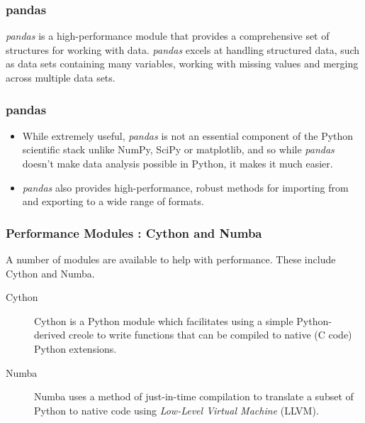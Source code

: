 \documentclass[MASTER.tex]{subfiles}
\begin{document}
\begin{frame}
	\frametitle{pandas}
	\textit{pandas} is a high-performance module that provides a comprehensive set of structures for working with
	data. \textit{pandas} excels at handling structured data, such as data sets containing many variables, working with
	missing values and merging across multiple data sets. 
\end{frame}
\begin{frame}
	\large
	\frametitle{pandas}	
	\begin{itemize}
	
	\item While extremely useful, \textit{pandas} is not an essential component of the Python scientific stack unlike NumPy, SciPy or matplotlib, and so while \textit{pandas} doesn’t
	make data analysis possible in Python, it makes it much easier. \item \textit{pandas} also provides high-performance,
	robust methods for importing from and exporting to a wide range of formats.
	\end{itemize}
\end{frame}
\begin{frame}
	
	\large
\frametitle{Performance Modules : Cython and Numba}
A number of modules are available to help with performance. These include Cython and Numba.

\begin{description}
	\item[Cython] Cython
	is a Python module which facilitates using a simple Python-derived creole to write functions that can be
	compiled to native (C code) Python extensions. 
	
	
	\item[Numba] 
	Numba uses a method of just-in-time compilation to
	translate a subset of Python to native code using \textit{Low-Level Virtual Machine} (LLVM).
\end{description} 

\end{frame}
\end{document}
